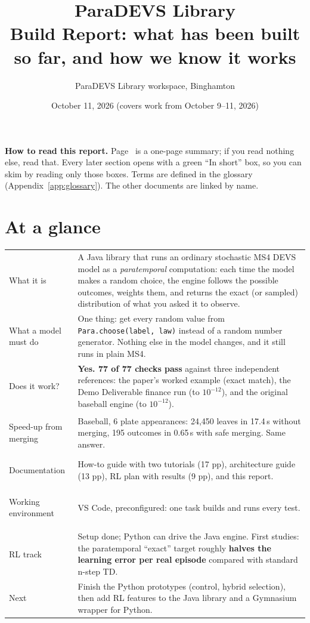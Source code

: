 \documentclass[11pt]{article}
\title{\textbf{ParaDEVS Library}\\[4pt]\large Build Report: what has been built so far, and how we know it works}
\author{ParaDEVS Library workspace, Binghamton}
\date{October 11, 2026 \quad (covers work from October 9--11, 2026)}
\newcommand{\code}[1]{\texttt{#1}}
\begin{document}
\maketitle

\begin{center}
\begin{minipage}{0.88\linewidth}\small
\textbf{How to read this report.} Page~\pageref{sec:glance} is a one-page summary; if you read nothing else, read
that. Every later section opens with a green ``In short'' box, so you can skim by reading only those boxes. Terms are
defined in the glossary (Appendix~\ref{app:glossary}). The other documents are linked by name.
\end{minipage}
\end{center}

\relateddocs

\tableofcontents
\newpage

\section{At a glance}\label{sec:glance}

\begin{tabularx}{\linewidth}{@{}>{\bfseries\raggedright\arraybackslash}p{3.6cm}Y@{}}
\toprule
What it is & A Java library that runs an ordinary stochastic MS4 DEVS model as a \emph{paratemporal} computation:
  each time the model makes a random choice, the engine follows the possible outcomes, weights them, and returns the
  exact (or sampled) distribution of what you asked it to observe.\\
What a model must do & One thing: get every random value from \code{Para.choose(label, law)} instead of a random
  number generator. Nothing else in the model changes, and it still runs in plain MS4.\\
Does it work? & \textbf{Yes. 77 of 77 checks pass} against three independent references: the paper's worked example
  (exact match), the Demo Deliverable finance run (to $10^{-12}$), and the original baseball engine (to $10^{-12}$).\\
Speed-up from merging & Baseball, 6 plate appearances: 24{,}450 leaves in 17.4\,s without merging, 195 outcomes in
  0.65\,s with safe merging. Same answer.\\
Documentation & How-to guide with two tutorials (17 pp), architecture guide (13 pp), RL plan with results (9 pp),
  and this report.\\
Working environment & VS Code, preconfigured: one task builds and runs every test.\\
RL track & Setup done; Python can drive the Java engine. First studies: the paratemporal ``exact'' target roughly
  \textbf{halves the learning error per real episode} compared with standard n-step TD.\\
Next & Finish the Python prototypes (control, hybrid selection), then add RL features to the Java library and a
  Gymnasium wrapper for Python.\\
\bottomrule
\end{tabularx}
\end{document}
